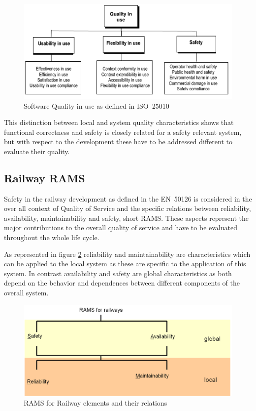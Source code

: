\documentclass{template/openetcs_report}
\begin{document}
\begin{figure}[htbp]
\centering
\includegraphics[width=0.7\linewidth]{Software-Quality-in-use}
\caption{Software Quality in use as defined in ISO~25010}
\label{fig:Software-Quality-in-use}
\end{figure}

This distinction between local and system quality characteristics shows that functional correctness and safety is closely related for a safety relevant system, but with respect to the development these have to be addressed different to evaluate their quality.

\subsection{Railway RAMS}
Safety in the railway development as defined in the EN~50126 is considered in the over all context of Quality of Service and the specific relations between reliability, availability, maintainability and safety, short RAMS. These aspects represent the major contributions to the overall quality of service and have to be evaluated throughout the whole life cycle.

As represented in figure \ref{fig:RAMS-EN50126} reliability and maintainability are characteristics which can be applied to the local system as these are specific to the application of this system. In contrast availability and safety are global characteristics as both depend on the behavior and dependences between different components of the overall system.

\begin{figure}[htbp]
\centering
\includegraphics[width=0.7\linewidth]{images/bld_RAMS-Railway-50126}
\caption{RAMS for Railway elements and their relations \cite{Schnieder.2013}}
\label{fig:RAMS-EN50126}
\end{figure}
\end{document}
